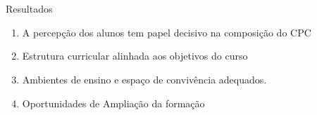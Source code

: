 \documentclass{beamer}
\begin{document}
\section*{}
\begin{frame}{Resultados}
	\begin{enumerate}
	\item A percepção dos alunos tem papel decisivo na composição do CPC
	\item Estrutura curricular alinhada aos objetivos do curso
	\item Ambientes de ensino e espaço de convivência adequados.
	\item Oportunidades de Ampliação da formação
	\end{enumerate}
\end{frame}
\end{document}
